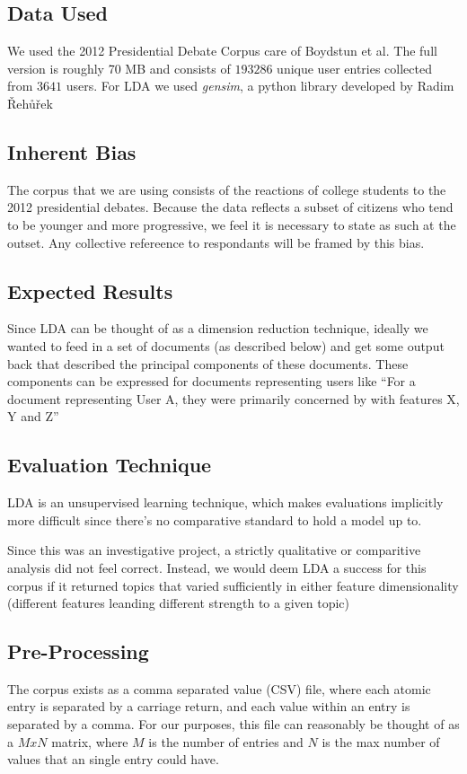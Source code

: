 \subsection{Data Used}
We used the 2012  Presidential Debate Corpus care of Boydstun et al. The full version is roughly 70 MB and consists of  $193286$ unique user entries collected from $3641$ users.
For LDA we used \emph{gensim}, a python library developed by Radim Řehůřek \cite{gensim}

\subsection{Inherent Bias}
The corpus that we are using consists of the reactions of college students to the 2012 presidential debates. Because the data reflects a subset of citizens who tend to be younger and more progressive, we feel it is necessary to state as such at the outset. Any collective refereence to respondants will be framed by this bias.

\subsection{Expected Results}
Since LDA can be thought of as a dimension reduction technique, ideally we wanted to feed in a set of documents (as described below) and get some output back that described the principal components of these documents. These components can be expressed for documents representing users like ``For a document representing User A, they were primarily concerned by with features X, Y and Z''

\subsection{Evaluation Technique}
LDA is an unsupervised learning technique, which makes evaluations implicitly more difficult since there's no comparative standard to hold a model up to.

Since this was an investigative project, a strictly qualitative or comparitive analysis did not feel correct. Instead, we would deem LDA a success for this corpus if it returned topics that varied sufficiently in either feature dimensionality (different features leanding different strength to a given topic) 

\subsection{Pre-Processing}
The corpus exists as a comma separated value (CSV) file, where each atomic entry is separated by a carriage return, and each value within an entry is separated by a comma. For our purposes, this file can reasonably be thought of as a $MxN$ matrix, where $M$ is the number of entries and $N$ is the max number of values that an single entry could have.

